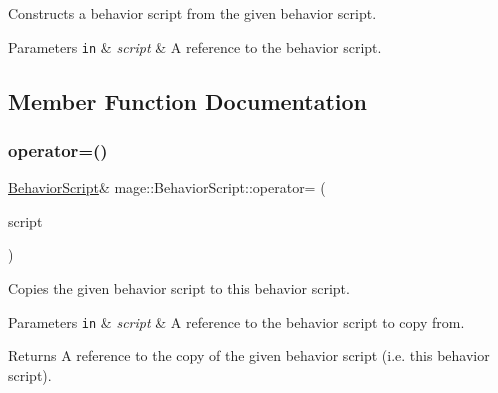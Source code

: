 Constructs a behavior script from the given behavior script.


\begin{DoxyParams}[1]{Parameters}
\mbox{\tt in}  & {\em script} & A reference to the behavior script. \\
\hline
\end{DoxyParams}


\subsection{Member Function Documentation}
\hypertarget{classmage_1_1_behavior_script_a0b3327ebf7009e668a7022d254cb1d51}{}\label{classmage_1_1_behavior_script_a0b3327ebf7009e668a7022d254cb1d51} 
\subsubsection{\texorpdfstring{operator=()}{operator=()}\hspace{0.1cm}{\footnotesize\ttfamily [1/2]}}
{\footnotesize\ttfamily \hyperlink{classmage_1_1_behavior_script}{Behavior\+Script}\& mage\+::\+Behavior\+Script\+::operator= (\begin{DoxyParamCaption}\item[{const \hyperlink{classmage_1_1_behavior_script}{Behavior\+Script} \&}]{script }\end{DoxyParamCaption})\hspace{0.3cm}{\ttfamily [delete]}}

Copies the given behavior script to this behavior script.


\begin{DoxyParams}[1]{Parameters}
\mbox{\tt in}  & {\em script} & A reference to the behavior script to copy from. \\
\hline
\end{DoxyParams}
\begin{DoxyReturn}{Returns}
A reference to the copy of the given behavior script (i.\+e. this behavior script). 
\end{DoxyReturn}
\hypertarget{classmage_1_1_behavior_script_a528c2bd218f2e6bb7d0a8ee50a05bf01}{}\label{classmage_1_1_behavior_script_a528c2bd218f2e6bb7d0a8ee50a05bf01} 
